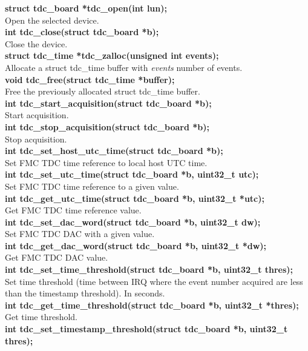 \documentclass[a4paper,11pt]{article}
\begin{document}
\textbf{struct tdc\_board *tdc\_open(int lun);} \\
Open the selected device.\\
\textbf{int tdc\_close(struct tdc\_board *b);}  \\
Close the device. \\
\textbf{struct tdc\_time *tdc\_zalloc(unsigned int events);} \\
Allocate a struct tdc\_time buffer with \textit{events} number of events. \\
\textbf{void tdc\_free(struct tdc\_time *buffer);} \\
Free the previously allocated struct tdc\_time buffer. \\
\textbf{int tdc\_start\_acquisition(struct tdc\_board *b);} \\
Start acquisition.\\
\textbf{int tdc\_stop\_acquisition(struct tdc\_board *b);} \\
Stop acquisition.\\
\textbf{int tdc\_set\_host\_utc\_time(struct tdc\_board *b);} \\
Set FMC TDC time reference to local host UTC time. \\
\textbf{int tdc\_set\_utc\_time(struct tdc\_board *b, uint32\_t utc);} \\
Set FMC TDC time reference to a given value.\\
\textbf{int tdc\_get\_utc\_time(struct tdc\_board *b, uint32\_t *utc);} \\
Get FMC TDC time reference value. \\
\textbf{int tdc\_set\_dac\_word(struct tdc\_board *b, uint32\_t dw);} \\
Set FMC TDC DAC with a given value. \\
\textbf{int tdc\_get\_dac\_word(struct tdc\_board *b, uint32\_t *dw);} \\
Get FMC TDC DAC value. \\
\textbf{int tdc\_set\_time\_threshold(struct tdc\_board *b, uint32\_t thres);} \\
Set time threshold (time between IRQ where the event number acquired are less than the timestamp
threshold). In seconds. \\
\textbf{int tdc\_get\_time\_threshold(struct tdc\_board *b, uint32\_t *thres);} \\
Get time threshold.\\
\textbf{int tdc\_set\_timestamp\_threshold(struct tdc\_board *b, uint32\_t thres);} \\
\end{document}
